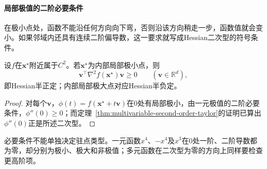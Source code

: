 \paragraph{局部极值的二阶必要条件}
在极小点处，函数不能沿任何方向向下弯，否则沿该方向稍走一步，函数值就会变小。如果邻域内还具有连续二阶偏导数，这一要求就写成Hessian二次型的符号条件。
\begin{theorem}[局部极值的二阶必要条件]
\label{thm:multivariable-extremum-second-order}
设$f$在$\bm x^\star$附近属于$C^2$。若$\bm x^\star$为内部局部极小点，则
\begin{equation}
 \bm v^\top\nabla^2f(\bm x^\star)\bm v\geq0
 \qquad(\bm v\in\mathbb R^d),
\label{eq:analysis-second-order-necessary}
\end{equation}
即Hessian半正定；内部局部极大点对应Hessian半负定。
\end{theorem}
\begin{proof}
对每个$\bm v$，$\phi(t)=f(\bm x^\star+t\bm v)$在$0$处有局部极小，由一元极值的二阶必要条件，$\phi''(0)\geq0$；而定理~\ref{thm:multivariable-second-order-taylor}的证明已算出$\phi''(0)$正是所述二次型。
\end{proof}
必要条件不能单独决定驻点类型。一元函数$x^4$、$-x^4$及$x^3$在$0$处一阶、二阶导数都为零，却分别为极小、极大和非极值；多元函数在二次型为零的方向上同样要检查更高阶项。

